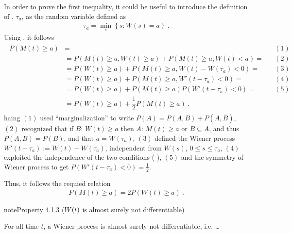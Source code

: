 \documentclass[letterpaper,10pt,english]{jupyterBook}
\begin{document}
\sphinxAtStartPar
{} In order to prove the first inequality, it could be useful to introduce the definition of , \(\tau_a\), as the random variable defined as
\begin{equation*}
\begin{split}\tau_a = \min_s \left\{ s: W(s) = a \right\} \ .\end{split}
\end{equation*}
\sphinxAtStartPar
Using , it follows
\begin{equation*}
\begin{split}\begin{aligned}
 P( M(t) \ge a ) 
 & = && (1) \\
 & = P( M(t) \ge a, W(t) \ge a) + P( M(t) \ge a,  W(t) < a) = && (2) \\
 & = P( W(t) \ge a ) + P( M(t) \ge a,  W(t) - W(\tau_a) < 0) = && (3) \\
 & = P( W(t) \ge a ) + P( M(t) \ge a,  W'(t - \tau_a) < 0) = && (4) \\
 & = P( W(t) \ge a ) + P( M(t) \ge a ) P (  W'(t - \tau_a) < 0) = && (5) \\
 & = P( W(t) \ge a ) + \dfrac{1}{2} P( M(t) \ge a ) \ .
 \end{aligned}\end{split}
\end{equation*}
\sphinxAtStartPar
haing \((1)\) used “marginalization” to write \(P(A) = P(A,B) + P(A, \overline{B})\), \((2)\) recognized that if \(B: \, W(t) \ge a\) then \(A: \, M(t) \ge a\) or \(B \subseteq A\), and thus \(P(A,B) = P(B)\), and that \(a = W(\tau_a)\), \((3)\) defined the Wiener process \(W'(t - \tau_a) := W(t) - W(\tau_a)\), independent from \(W(s)\), \(0 \le s \le \tau_a\), \((4)\) exploited the independence of the two conditions ( ), \((5)\) and the symmetry of Wiener process to get \(P(W'(t-\tau_a) < 0) = \frac{1}{2}\).

\sphinxAtStartPar
Thus, it follows the requied relation
\begin{equation*}
\begin{split}P(M(t) \ge a) = 2 P(W(t) \ge a) \ .\end{split}
\end{equation*}

\label{ch/prob/wiener:property-3}
\begin{sphinxadmonition}{note}{Property 4.1.3 (\protect\(W(t)\protect\) is almost surely not differentiable)}



\sphinxAtStartPar
For all time \(t\), a Wiener process is almost surely not differentiable, i.e. …
\end{sphinxadmonition}
\end{document}
